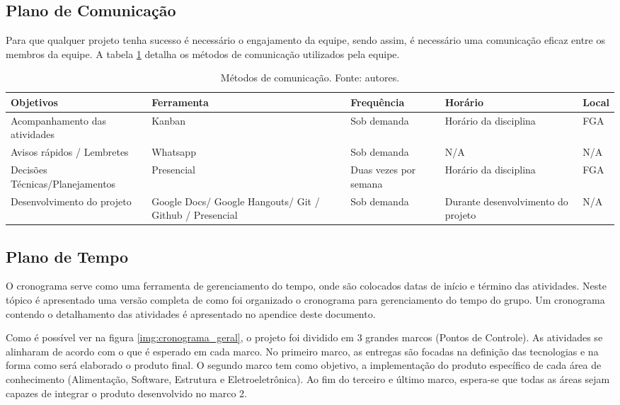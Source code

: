     \subsection{Plano de Comunicação}

      Para que qualquer projeto tenha sucesso é necessário o engajamento da equipe, sendo assim, é necessário uma comunicação eficaz entre os membros da equipe. A tabela \ref{tab:com} detalha os métodos de comunicação utilizados pela equipe.
      
      \begin{table}[!htbp]
      	\begin{center}
      		\caption{\label{tab:com}Métodos de comunicação. Fonte: autores.}
      		\begin{tabular}{|p{3.5cm}|p{3cm}|p{3cm}|p{3cm}|p{1cm}|}
      			\hline
      			\textbf{Objetivos} & \textbf{Ferramenta} & \textbf{Frequência} & \textbf{Horário} & \textbf{Local}\\\hline
      			Acompanhamento das atividades & Kanban & Sob demanda & Horário da disciplina & FGA\\\hline
      			Avisos rápidos / Lembretes & Whatsapp & Sob demanda & N/A & N/A\\\hline
      			Decisões Técnicas/Planejamentos & Presencial & Duas vezes por semana & Horário da disciplina & FGA\\\hline
      			Desenvolvimento do projeto & Google Docs/ Google Hangouts/ Git / Github / Presencial & Sob demanda & Durante desenvolvimento do projeto & N/A\\\hline
      		\end{tabular}
      	\end{center}
      \end{table}

\newpage

    \subsection{Plano de Tempo}
	O cronograma serve como uma ferramenta de gerenciamento do tempo, onde são colocados datas de início e término das atividades. Neste tópico é apresentado uma versão completa de como foi organizado o cronograma para gerenciamento do tempo do grupo. Um cronograma contendo o detalhamento das atividades é apresentado no apendice deste documento.

	Como é possível ver na figura \ref{img:cronograma_geral}, o projeto foi dividido em 3 grandes marcos (Pontos de Controle). As atividades se alinharam de acordo com o que é esperado em cada marco. No primeiro marco, as entregas são focadas na definição das tecnologias e na forma como será elaborado o produto final. O segundo marco tem como objetivo, a implementação do produto específico de cada área de conhecimento (Alimentação, Software, Estrutura e Eletroeletrônica). Ao fim do terceiro e último marco, espera-se que todas as áreas sejam capazes de integrar o produto desenvolvido no marco 2. 

